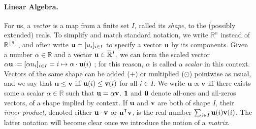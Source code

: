 
\paragraph{Linear Algebra.}
For us, a \emph{vector} is a map from a finite set $I$, called its 
\emph{shape}, to the (possibly extended) reals.
To simplify and match standard notation, we write $\mathbb R^n$ instead of $\mathbb R^{[n]}$, and often write $\mathbf u = [u_i]_{i \in I}$ to specify a vector $\mathbf u$ by its components.
Given a number $\alpha \in \mathbb R$ and a vector $\mathbf u \in \mskip1mu\overline{\mskip-1mu\mathbb R\!}\,^I$,
    we can form the scaled vector 
    $\alpha \mathbf u := [ \alpha  u_i ]_{i \in I} = i \mapsto \mathbf \alpha \cdot \mathbf u(i)$
    \unskip;
    for this reason, $\alpha$ is called a \emph{scalar} in this context. 
Vectors of the same shape
can be added ($+$) or multiplied ($\odot$) pointwise as usual,
and we say that $\mathbf u \le \mathbf v$ iff $\mathbf u(i) \le \mathbf v(i)$ for all $i \in I$.
We write $\mathbf u \propto \mathbf v$ iff there exists some a scalar $\alpha \in \mathbb R$ such that $\mathbf u = \alpha \mathbf v$.
$\mathbf 1$ and $\mathbf 0$ denote all-ones and all-zeros vectors, of a shape implied by context.
If $\mathbf u$ and $\mathbf v$ are both of shape $I$, their \emph{inner product}, denoted either $\mathbf u \cdot \mathbf v$ or $\mathbf u ^{\sf T} \mathbf v$,
    is the real number $\sum_{i \in I} \mathbf u(i) \mathbf v(i)$. 
The latter notation will become clear once we introduce the notion of a \emph{matrix}. 

